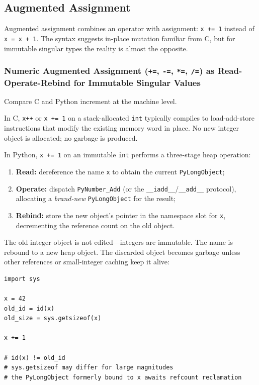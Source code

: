\documentclass[a4paper,twoside]{report}
\begin{document}
\subsection{Augmented Assignment}

Augmented assignment combines an operator with assignment: \texttt{x += 1} instead of \texttt{x = x + 1}. The syntax suggests in-place mutation familiar from C, but for immutable singular types the reality is almost the opposite.

\subsubsection{Numeric Augmented Assignment (\texttt{+=}, \texttt{-=}, \texttt{*=}, \texttt{/=}) as Read-Operate-Rebind for Immutable Singular Values}

Compare C and Python increment at the machine level.

In C, \texttt{x++} or \texttt{x += 1} on a stack-allocated \texttt{int} typically compiles to load-add-store instructions that modify the existing memory word in place. No new integer object is allocated; no garbage is produced.

In Python, \texttt{x += 1} on an immutable \texttt{int} performs a three-stage heap operation:

\begin{enumerate}
    \item \textbf{Read:} dereference the name \texttt{x} to obtain the current \texttt{PyLongObject};
    \item \textbf{Operate:} dispatch \texttt{PyNumber\_Add} (or the \texttt{\_\_iadd\_\_}/\texttt{\_\_add\_\_} protocol), allocating a \emph{brand-new} \texttt{PyLongObject} for the result;
    \item \textbf{Rebind:} store the new object's pointer in the namespace slot for \texttt{x}, decrementing the reference count on the old object.
\end{enumerate}

The old integer object is not edited---integers are immutable. The name is rebound to a new heap object. The discarded object becomes garbage unless other references or small-integer caching keep it alive:

\begin{verbatim}
import sys

x = 42
old_id = id(x)
old_size = sys.getsizeof(x)

x += 1

# id(x) != old_id
# sys.getsizeof may differ for large magnitudes
# the PyLongObject formerly bound to x awaits refcount reclamation
\end{verbatim}
\end{document}
